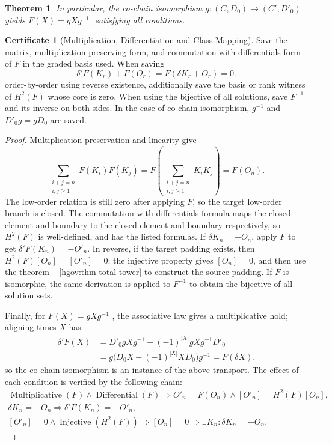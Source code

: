 \documentclass[12pt,a4paper,openany,notitlepage]{report}
\theoremstyle{plain}
\newtheorem{theorem}{Theorem}[chapter]
\theoremstyle{definition}
\newtheorem*{certificate}{Certificate}
\theoremstyle{remark}
\begin{document}
\begin{CJK*}
\begin{theorem}
In particular, the co-chain isomorphism $g:(C,D_0)\to(C',D'_0)$ yields $F(X)=gXg^{-1}$, satisfying all conditions.\end{theorem}
\begin{certificate}
[Multiplication, Differentiation and Class Mapping]Save the matrix, multiplication-preserving form, and commutation with differentials form of $F$ in the graded basis used. When saving \[
 \delta'F(K_r)+F(O_r)=F(\delta K_r+O_r)=0.
\] order-by-order using reverse existence, additionally save the basis or rank witness of $H^2(F)$ whose core is zero. When using the bijective of all solutions, save $F^{-1}$ and its inverse on both sides. In the case of co-chain isomorphism, $g^{-1}$ and $D'_0g=gD_0$ are saved.\end{certificate}
\begin{proof}
Multiplication preservation and linearity give \[
 \sum_{\substack{i+j=n\\i,j\ge1}}F(K_i)F(K_j)
 =F\left(\sum_{\substack{i+j=n\\i,j\ge1}}K_iK_j\right)
 =F(O_n).
\] The low-order relation is still zero after applying $F$, so the target low-order branch is closed. The commutation with differentials formula maps the closed element and boundary to the closed element and boundary respectively, so $H^2(F)$ is well-defined, and has the listed formulas. If $\delta K_n=-O_n$, apply $F$ to get $\delta'F(K_n)=-O'_n$. In reverse, if the target padding exists, then $H^2(F)[O_n]=[O'_n]=0$; the injective property gives $[O_n]=0$, and then use the theorem ~ \ref{hgov:thm-total-tower} to construct the source padding. If $F$ is isomorphic, the same derivation is applied to $F^{-1}$ to obtain the bijective of all solution sets.

Finally, for $F(X)=gXg^{-1}$ , the associative law gives a multiplicative hold; aligning times $X$ has \[
 \begin{aligned}
 \delta'F(X)
 &=D'_0gXg^{-1}-(-1)^{|X|}gXg^{-1}D'_0\\
 &=g\bigl(D_0X-(-1)^{|X|}XD_0\bigr)g^{-1}
 =F(\delta X).
 \end{aligned}
\] so the co-chain isomorphism is an instance of the above transport. The effect of each condition is verified by the following chain: \[
 \begin{gathered}
 \operatorname{Multiplicative}(F)\land
 \operatorname{Differential}(F)
 \Rightarrow O'_n=F(O_n)
 \land[O'_n]=H^2(F)[O_n],\\
 \delta K_n=-O_n
 \Rightarrow\delta'F(K_n)=-O'_n,\\
 [O'_n]=0\land\operatorname{Injective}(H^2(F))
 \Rightarrow[O_n]=0
 \Rightarrow\exists K_n:\delta K_n=-O_n.
 \end{gathered}
\]\end{proof}



\end{CJK*}
\end{document}
